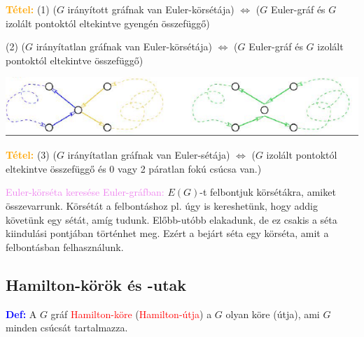 \documentclass[../szamtud.tex]{subfiles}
\begin{document}
        \textcolor{orange}{\textbf{Tétel:}} (1) ($G$ irányított gráfnak van Euler-körsétája) $\Longleftrightarrow$ ($G$ Euler-gráf és $G$ izolált pontoktól eltekintve gyengén összefüggő) 
        
        (2) ($G$ irányítatlan gráfnak van Euler-körsétája) $\Longleftrightarrow$ ($G$ Euler-gráf és $G$ izolált pontoktól eltekintve összefüggő)


        \includegraphics[width=\textwidth]{./img/3.png}

        \textcolor{orange}{\textbf{Tétel:}} (3) ($G$ irányítatlan gráfnak van Euler-sétája) $\Longleftrightarrow$ ($G$ izolált pontoktól eltekintve összefüggő és 0 vagy 2 páratlan fokú csúcsa van.)


        \textcolor{violet}{Euler-körséta keresése Euler-gráfban:} $E(G)$-t felbontjuk körsétákra, amiket összevarrunk. Körsétát a felbontáshoz pl. úgy is kereshetünk, hogy addig követünk egy sétát, amíg tudunk. Előbb-utóbb elakadunk, de ez csakis a séta kiindulási pontjában történhet meg. Ezért a bejárt séta egy körséta, amit a felbontásban felhasználunk.

    \subsection{Hamilton-körök és -utak} 

        \textcolor{blue}{\textbf{Def:}} A $G$ gráf \textcolor{red}{Hamilton-köre} (\textcolor{red}{Hamilton-útja}) a $G$ olyan köre (útja), ami $G$ minden csúcsát tartalmazza. 
\end{document}
